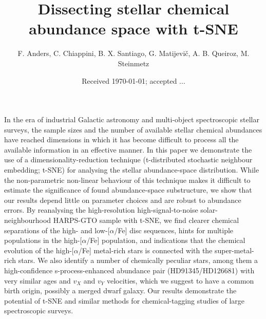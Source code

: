 \documentclass{aa}  %
\begin{document}
 

   \title{Dissecting stellar chemical abundance space with t-SNE}

   \author{F. Anders, C. Chiappini, B. X. Santiago, G. Matijevi\v{c}, A. B. Queiroz, M. Steinmetz%
   }
   
   

   \date{Received \today; accepted ...}

  \abstract
   {%
   In the era of industrial Galactic astronomy and multi-object spectroscopic stellar surveys, the sample sizes and the number of available stellar chemical abundances have reached dimensions in which it has become difficult to process all the available information in an effective manner. In this paper we demonstrate the use of a dimensionality-reduction technique (t-distributed stochastic neighbour embedding; t-SNE) for analysing the stellar abundance-space distribution. While the non-parametric non-linear behaviour of this technique makes it difficult to estimate the significance of found abundance-space substructure, we show that our results depend little on parameter choices and are robust to abundance errors. By reanalysing the high-resolution high-signal-to-noise solar-neighbourhood HARPS-GTO sample with t-SNE, we find clearer chemical separations of the high- and low-[$\alpha$/Fe] disc sequences, hints for multiple populations in the high-[$\alpha$/Fe] population, and indications that the chemical evolution of the high-[$\alpha$/Fe] metal-rich stars is connected with the super-metal-rich stars. We also identify a number of chemically peculiar stars, among them a high-confidence s-process-enhanced abundance pair (HD91345/HD126681) with very similar ages and $v_X$ and $v_Y$ velocities, which we suggest to have a common birth origin, possibly a merged dwarf galaxy. Our results demonstrate the potential of t-SNE and similar methods for chemical-tagging studies of large spectroscopic surveys.}
\end{document}
